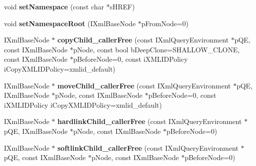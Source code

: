 \begin{DoxyCompactItemize}
\item 
\hypertarget{classgeneral__server_1_1LibXmlBaseNode_a5e157100eea3e72cd7f4a9883a926f71}{void {\bfseries set\-Namespace} (const char $\ast$s\-H\-R\-E\-F)}\label{classgeneral__server_1_1LibXmlBaseNode_a5e157100eea3e72cd7f4a9883a926f71}

\item 
\hypertarget{classgeneral__server_1_1LibXmlBaseNode_a77cfc5b2491aea4023c909f003e02183}{void {\bfseries set\-Namespace\-Root} (\-I\-Xml\-Base\-Node $\ast$p\-From\-Node=0)}\label{classgeneral__server_1_1LibXmlBaseNode_a77cfc5b2491aea4023c909f003e02183}

\item 
\hypertarget{classgeneral__server_1_1LibXmlBaseNode_a9110b34b5068382e08a1e69164bee4e0}{\-I\-Xml\-Base\-Node $\ast$ {\bfseries copy\-Child\-\_\-caller\-Free} (const \-I\-Xml\-Query\-Environment $\ast$p\-Q\-E, const \-I\-Xml\-Base\-Node $\ast$p\-Node, const bool b\-Deep\-Clone=\-S\-H\-A\-L\-L\-O\-W\-\_\-\-C\-L\-O\-N\-E, const \-I\-Xml\-Base\-Node $\ast$p\-Before\-Node=0, const i\-X\-M\-L\-I\-D\-Policy i\-Copy\-X\-M\-L\-I\-D\-Policy=xmlid\-\_\-default)}\label{classgeneral__server_1_1LibXmlBaseNode_a9110b34b5068382e08a1e69164bee4e0}

\item 
\hypertarget{classgeneral__server_1_1LibXmlBaseNode_a46031bbc467f87081eb4ab587de86262}{\-I\-Xml\-Base\-Node $\ast$ {\bfseries move\-Child\-\_\-caller\-Free} (const \-I\-Xml\-Query\-Environment $\ast$p\-Q\-E, \-I\-Xml\-Base\-Node $\ast$p\-Node, const \-I\-Xml\-Base\-Node $\ast$p\-Before\-Node=0, const i\-X\-M\-L\-I\-D\-Policy i\-Copy\-X\-M\-L\-I\-D\-Policy=xmlid\-\_\-default)}\label{classgeneral__server_1_1LibXmlBaseNode_a46031bbc467f87081eb4ab587de86262}

\item 
\hypertarget{classgeneral__server_1_1LibXmlBaseNode_acc0ee892091d40e1ded535fe4087c550}{\-I\-Xml\-Base\-Node $\ast$ {\bfseries hardlink\-Child\-\_\-caller\-Free} (const \-I\-Xml\-Query\-Environment $\ast$p\-Q\-E, \-I\-Xml\-Base\-Node $\ast$p\-Node, const \-I\-Xml\-Base\-Node $\ast$p\-Before\-Node=0)}\label{classgeneral__server_1_1LibXmlBaseNode_acc0ee892091d40e1ded535fe4087c550}

\item 
\hypertarget{classgeneral__server_1_1LibXmlBaseNode_a8c24deb69819a351bb4a2ea894273504}{\-I\-Xml\-Base\-Node $\ast$ {\bfseries softlink\-Child\-\_\-caller\-Free} (const \-I\-Xml\-Query\-Environment $\ast$p\-Q\-E, const \-I\-Xml\-Base\-Node $\ast$p\-Node, const \-I\-Xml\-Base\-Node $\ast$p\-Before\-Node=0)}\label{classgeneral__server_1_1LibXmlBaseNode_a8c24deb69819a351bb4a2ea894273504}


\end{DoxyCompactItemize}
